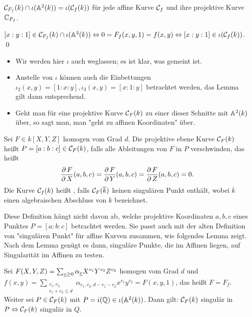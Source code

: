 \begin{lemma}
	$\mathcal{C}_{F_f}(k) \cap \iota(\mathbb{A}^2(k)) = \iota(\mathcal{C}_f(k))$ für jede affine Kurve $\mathcal{C}_f$ und ihre projektive Kurve $\mathbb{C}_{F_f}$.
\end{lemma}

	$[x:y:1] \in \mathcal{C}_{F_f}(k) \cap \iota(\mathbb{A}^2(k)) \Leftrightarrow 0 = F_f(x,y,1) = f(x,y) \Leftrightarrow [x:y:1] \in \iota(\mathcal{C}_f(k))$. \qed
	
\begin{bem}
	\begin{itemize}
		\item Wir werden hier $\iota$ auch weglassen; es ist klar, was gemeint ist.
		\item Anstelle von $\iota$ können auch die Einbettungen $\iota_2(x,y) = [1:x:y], \iota_3(x,y) = [x:1:y]$ betrachtet werden, das Lemma gilt dann entsprechend.
		\item Geht man für eine projektive Kurve $\mathcal{C}_F(k)$ zu einer dieser Schnitte mit $\mathbb{A}^2(k)$ über, so sagt man, man "geht zu affinen Koordinaten" über.
	\end{itemize}
\end{bem}

\begin{defn}
	Sei $F \in k[X,Y,Z]$ homogen vom Grad $d$. Die projektive ebene Kurve $\mathcal{C}_F(k)$ heißt  \linebreak $P=[a:b:c] \in \mathcal{C}_F(k)$, falls alle Ableitungen von $F$ in $P$ verschwinden, das heißt
	\[ \frac{\operatorname{\partial} F}{\operatorname{\partial} X}(a,b,c) = \frac{\operatorname{\partial} F}{\operatorname{\partial} Y}(a,b,c) = \frac{\operatorname{\partial} F}{\operatorname{\partial} Z}(a,b,c) = 0.\]
	Die Kurve $\mathcal{C}_f(k)$ heißt , falls $\mathcal{C}_F(\overline{k})$ keinen singulären Punkt enthält, wobei $\overline{k}$ einen algebraischen Abschluss von $k$ bezeichnet. 
\end{defn}

\begin{bem}
	Diese Definition hängt nicht davon ab, welche projektive Koordinaten $a,b,c$ eines Punktes $P = [a:b:c]$ betrachtet werden. Sie passt auch mit der alten Definition von "singulären Punkt" für affine Kurven zusammen, wie folgendes Lemma zeigt. Nach dem Lemma genügt es dann, singuläre Punkte, die im Affinen liegen, auf Singularität im Affinen zu testen.
\end{bem}

\begin{lemma}
	Sei $F(X,Y,Z) = \sum_{\uline{v} \geq 0} \alpha_{\uline{v}} X^{v_1} Y^{v_2} Z^{v_3}$ homogen vom Grad $d$ und $f(x,y) = \sum_{\substack{v_1,v_2 \\ v_1 + v_2 \leq d}} \alpha_{v_1,v_2,d-v_1-v_2}x^{v_1} y^{v_2} = F(x,y,1)$, das heißt $F = F_f$. Weiter sei $P \in \mathcal{C}_F(k)$ mit $P = i(\mathbb{Q}) \in \iota(\mathbb{A}^2(k))$. Dann gilt: $\mathcal{C}_F(k)$ singulär in $P \Leftrightarrow \mathcal{C}_F(k)$ singulär in $Q$.
\end{lemma}

